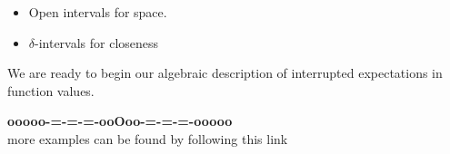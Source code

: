 \documentclass{ximera}
\begin{document}
\begin{itemize}
\item Open intervals for space.
\item $\delta$-intervals for closeness
\end{itemize}


We are ready to begin our algebraic description of interrupted expectations in function values. 























\begin{center}
\textbf{\textcolor{green!50!black}{ooooo-=-=-=-ooOoo-=-=-=-ooooo}} \\

more examples can be found by following this link\\ 

\end{center}
\end{document}
